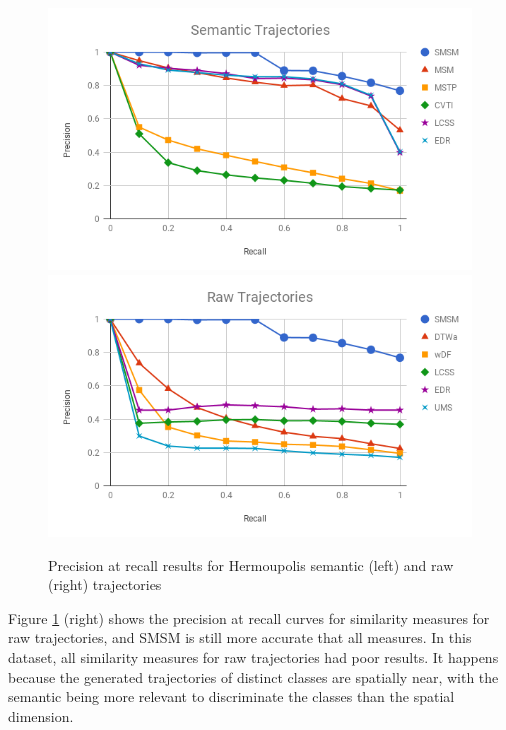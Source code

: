 \documentclass[12pt]{article}
\begin{document}
\begin{figure}[ht!]
\centerline{
\centering
\includegraphics[width=.45\textwidth]{Images/P_R-chart_Hermoupolis_semantic.png}
\includegraphics[width=.45\textwidth]{Images/P_R-chart_Hermoupolis_raw.png}
}
\caption{Precision at recall results for Hermoupolis semantic (left) and raw (right) trajectories}
\label{fig:hermoupolis_precision_recall}
\end{figure}

Figure \ref{fig:hermoupolis_precision_recall} (right) shows the precision at recall curves for similarity measures for raw trajectories, and SMSM is still more accurate that all measures. In this dataset, all similarity measures for raw trajectories had poor results. It happens because the generated trajectories of distinct classes are spatially near, with the semantic being more relevant to discriminate the classes than the spatial dimension.
\end{document}
